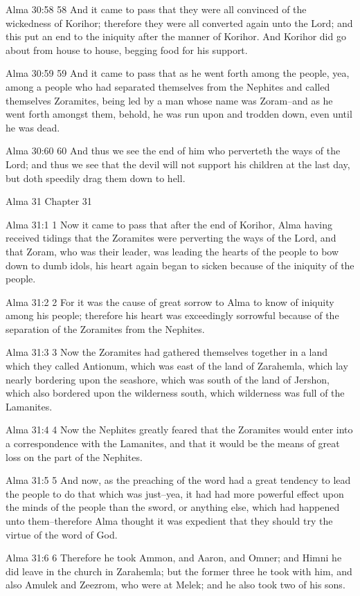 Alma 30:58
 58 And it came to pass that they were all convinced of the
wickedness of Korihor; therefore they were all converted again
unto the Lord; and this put an end to the iniquity after the
manner of Korihor. And Korihor did go about from house to house,
begging food for his support.

Alma 30:59
 59 And it came to pass that as he went forth among the people,
yea, among a people who had separated themselves from the
Nephites and called themselves Zoramites, being led by a man
whose name was Zoram--and as he went forth amongst them, behold,
he was run upon and trodden down, even until he was dead.

Alma 30:60
 60 And thus we see the end of him who perverteth the ways of the
Lord; and thus we see that the devil will not support his
children at the last day, but doth speedily drag them down to
hell.

Alma 31
Chapter 31

Alma 31:1
 1 Now it came to pass that after the end of Korihor, Alma having
received tidings that the Zoramites were perverting the ways of
the Lord, and that Zoram, who was their leader, was leading the
hearts of the people to bow down to dumb idols, his heart again
began to sicken because of the iniquity of the people.

Alma 31:2
 2 For it was the cause of great sorrow to Alma to know of
iniquity among his people; therefore his heart was exceedingly
sorrowful because of the separation of the Zoramites from the
Nephites.

Alma 31:3
 3 Now the Zoramites had gathered themselves together in a land
which they called Antionum, which was east of the land of
Zarahemla, which lay nearly bordering upon the seashore, which
was south of the land of Jershon, which also bordered upon the
wilderness south, which wilderness was full of the Lamanites.

Alma 31:4
 4 Now the Nephites greatly feared that the Zoramites would enter
into a correspondence with the Lamanites, and that it would be
the means of great loss on the part of the Nephites.

Alma 31:5
 5 And now, as the preaching of the word had a great tendency to
lead the people to do that which was just--yea, it had had more
powerful effect upon the minds of the people than the sword, or
anything else, which had happened unto them--therefore Alma
thought it was expedient that they should try the virtue of the
word of God.

Alma 31:6
 6 Therefore he took Ammon, and Aaron, and Omner; and Himni he
did leave in the church in Zarahemla; but the former three he
took with him, and also Amulek and Zeezrom, who were at Melek;
and he also took two of his sons.

